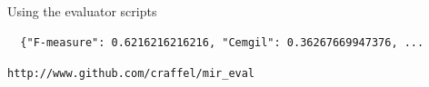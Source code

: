 \documentclass[paperwidth=120cm,paperheight=150cm,portrait,fontscale=.22,margin=5cm,lmargin=.2cm,rmargin=.2cm]{baposter}
\begin{document}
\begin{poster}
\begin{posterbox}[name=evaluator,column=1,below=average]{Using the evaluator scripts}
\begin{verbatim}
  {"F-measure": 0.6216216216216, "Cemgil": 0.36267669947376, ...
\end{verbatim}

\end{posterbox}

\begin{posterbox}[name=url,column=0,below=python,span=2,boxColorOne=white]{}

\centering\huge
\texttt{http://www.github.com/craffel/mir\_eval}

\end{posterbox}

\end{poster}
\end{document}
